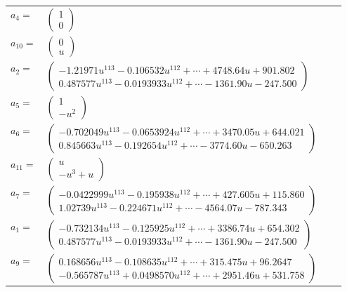 \documentclass[1p]{elsarticle_modified}
\theoremstyle{definition}
\begin{document}
\begin{tabular}{m{7pt} m{180pt} m{7pt} m{180pt} }
\flushright $a_{4}=$&$\begin{pmatrix}1\\0\end{pmatrix}$ \\
\flushright $a_{10}=$&$\begin{pmatrix}0\\u\end{pmatrix}$ \\
\flushright $a_{2}=$&$\begin{pmatrix}-1.21971 u^{113}-0.106532 u^{112}+\cdots+4748.64 u+901.802\\0.487577 u^{113}-0.0193933 u^{112}+\cdots-1361.90 u-247.500\end{pmatrix}$ \\
\flushright $a_{5}=$&$\begin{pmatrix}1\\- u^2\end{pmatrix}$ \\
\flushright $a_{6}=$&$\begin{pmatrix}-0.702049 u^{113}-0.0653924 u^{112}+\cdots+3470.05 u+644.021\\0.845663 u^{113}-0.192654 u^{112}+\cdots-3774.60 u-650.263\end{pmatrix}$ \\
\flushright $a_{11}=$&$\begin{pmatrix}u\\- u^3+u\end{pmatrix}$ \\
\flushright $a_{7}=$&$\begin{pmatrix}-0.0422999 u^{113}-0.195938 u^{112}+\cdots+427.605 u+115.860\\1.02739 u^{113}-0.224671 u^{112}+\cdots-4564.07 u-787.343\end{pmatrix}$ \\
\flushright $a_{1}=$&$\begin{pmatrix}-0.732134 u^{113}-0.125925 u^{112}+\cdots+3386.74 u+654.302\\0.487577 u^{113}-0.0193933 u^{112}+\cdots-1361.90 u-247.500\end{pmatrix}$ \\
\flushright $a_{9}=$&$\begin{pmatrix}0.168656 u^{113}-0.108635 u^{112}+\cdots+315.475 u+96.2647\\-0.565787 u^{113}+0.0498570 u^{112}+\cdots+2951.46 u+531.758\end{pmatrix}$ \\

\end{tabular}
\end{document}
